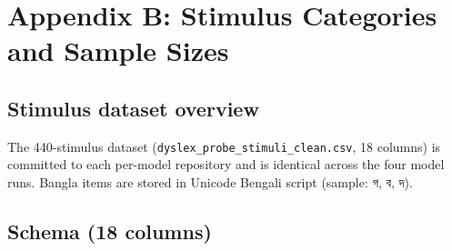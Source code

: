 \chapter*{Appendix B: Stimulus Categories and Sample Sizes}

\section*{Stimulus dataset overview}

The 440-stimulus dataset (\texttt{dyslex\_probe\_stimuli\_clean.csv}, 18 columns) is committed to each per-model repository and is identical across the four model runs. Bangla items are stored in Unicode Bengali script (sample: {\banglafont গ}, {\banglafont ব}, {\banglafont দ}).

\begin{table}[H]
\centering
\caption{Per-category stimulus counts (English / Bangla). Total 440 items.}
\label{tab:stim-distribution}
\small
{}
\end{table}

\section*{Schema (18 columns)}

